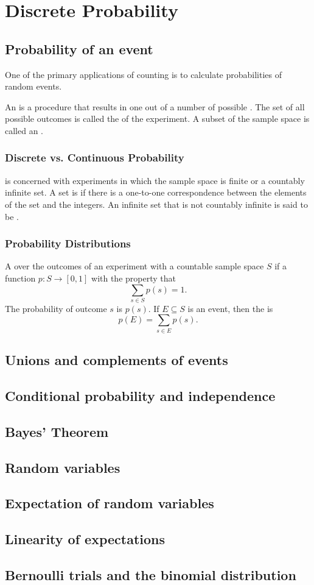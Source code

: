 \section{Discrete Probability}
\subsection{Probability of an event}
One of the primary applications of counting is to calculate probabilities of random events.

An  is a procedure that results in one out of a number of possible . The set of all possible outcomes is called the  of the experiment. A subset of the sample space is called an .

\subsubsection*{Discrete vs. Continuous Probability}
 is concerned with experiments in which the sample space is finite or a countably infinite set. A set is  if there is a one-to-one correspondence between the elements of the set and the integers. An infinite set that is not countably infinite is said to be .

\subsubsection*{Probability Distributions}
A  over the outcomes of an experiment with a countable sample space $S$ if a function $p: S \rightarrow [0,1]$ with the property that
\[
  \sum_{s \in S} p(s) = 1.
\]
The probability of outcome $s$ is $p(s)$. If $E \subseteq S$ is an event, then the  is
\[
  p(E) = \sum_{s \in E} p(s).
\]

\subsection{Unions and complements of events}
\subsection{Conditional probability and independence}
\subsection{Bayes' Theorem}
\subsection{Random variables}
\subsection{Expectation of random variables}
\subsection{Linearity of expectations}
\subsection{Bernoulli trials and the binomial distribution}